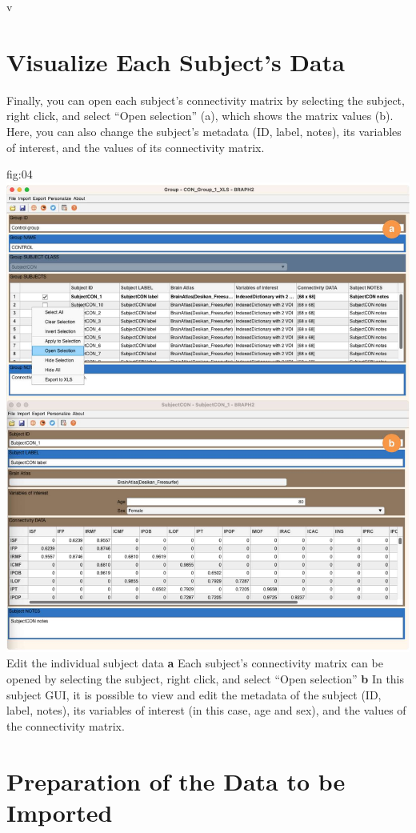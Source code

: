v\documentclass[justified]{tufte-handout}
\begin{document}
\section{Visualize Each Subject's Data}

Finally, you can open each subject's connectivity matrix by selecting the subject, right click, and select ``Open selection'' (a), which shows the matrix values (b). Here, you can also change the subject's metadata (ID, label, notes), its variables of interest, and the values of its connectivity matrix.

	{fig:04}
	{\includegraphics{fig04.jpg}
	}
	{Edit the individual subject data}
	{
	{\bf a}  Each subject's connectivity matrix can be opened by selecting the subject, right click, and select ``Open selection''
	{\bf b} In this subject GUI, it is possible to view and edit the metadata of the subject (ID, label, notes), its variables of interest (in this case, age and sex), and the values of the connectivity matrix. 
	}

\clearpage
\section{Preparation of the Data to be Imported}
\end{document}
